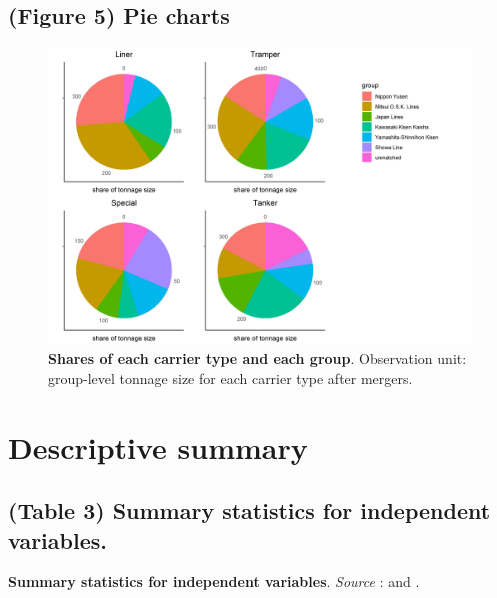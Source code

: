 \documentclass[
  10pt,
]{article}
\begin{document}
\hypertarget{figure-5-pie-charts}{%
\subsection{(Figure 5) Pie charts}\label{figure-5-pie-charts}}

\begin{figure}[!ht]
\begin{center}
\includegraphics[height = 0.37\textheight]{../figuretable/carrier_share_eachgroup.png}
\end{center}
\caption{\textbf{Shares of each carrier type and each group}. Observation unit: group-level tonnage size for each carrier type after mergers. }
\label{fg:carrier_share_eachgroup}
\end{figure}

\hypertarget{descriptive-summary}{%
\section{Descriptive summary}\label{descriptive-summary}}

\hypertarget{table-3-summary-statistics-for-independent-variables.}{%
\subsection{(Table 3) Summary statistics for independent
variables.}\label{table-3-summary-statistics-for-independent-variables.}}

\begin{table}[!ht]
\scriptsize
\caption{\textbf{Summary statistics for independent variables}. \textit{Source} : \cite{listgaikou} and \cite{nostalgic}.}
\label{tb:shipping_market_stats_table}
\begin{center}

\end{center}
\end{table}
\end{document}
